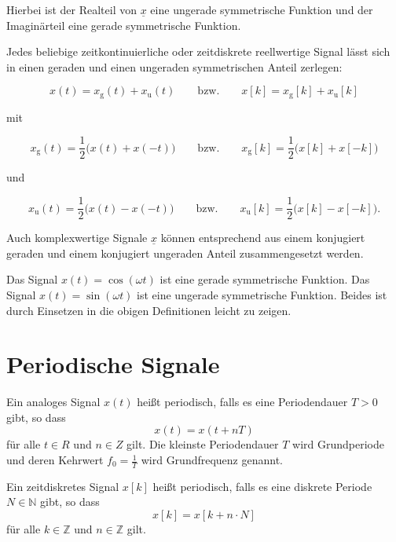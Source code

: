 Hierbei ist der Realteil von $\underline{x}$ eine ungerade symmetrische Funktion und der Imaginärteil eine gerade symmetrische Funktion.

Jedes beliebige zeitkontinuierliche oder zeitdiskrete reellwertige Signal lässt sich in einen geraden und einen ungeraden symmetrischen Anteil zerlegen:

$$
x(t) = x_{\mathrm{g}}(t) + x_{\mathrm{u}}(t) \qquad \text{bzw.} \qquad x[k] = x_{\mathrm{g}}[k] + x_{\mathrm{u}}[k]
$$

mit

$$
x_{\mathrm{g}}(t) = \frac{1}{2}\bigl(x(t) + x(-t)\bigr) \qquad \text{bzw.} \qquad x_{\mathrm{g}}[k] = \frac{1}{2}\bigl(x[k] + x[-k]\bigr)
$$

und

$$
x_{\mathrm{u}}(t) = \frac{1}{2}\bigl(x(t) - x(-t)\bigr) \qquad \text{bzw.} \qquad x_{\mathrm{u}}[k] = \frac{1}{2}\bigl(x[k] - x[-k]\bigr).
$$

Auch komplexwertige Signale $\underline{x}$ können entsprechend aus einem konjugiert geraden und einem konjugiert ungeraden Anteil zusammengesetzt werden.

\begin{beispiel}[Symmetrie]
Das Signal $x(t) = \cos(\omega t)$ ist eine gerade symmetrische Funktion. Das Signal $x(t) = \sin(\omega t)$ ist eine ungerade symmetrische Funktion. Beides ist durch Einsetzen in die obigen Definitionen leicht zu zeigen.
\end{beispiel}


\section{Periodische Signale}
\label{sec:periodische-signale}

\begin{definition}
Ein analoges Signal $x(t)$ heißt periodisch, falls es eine Periodendauer
$T > 0$ gibt, so dass
$$
x(t) = x(t + nT)
$$
für alle $t \in R$ und $n \in Z$ gilt.
Die kleinste Periodendauer $T$ wird Grundperiode und deren Kehrwert $f_0 = \frac{1}{T}$ wird
Grundfrequenz genannt.
\end{definition}

\begin{definition}
Ein zeitdiskretes Signal $x[k]$ heißt periodisch, falls es eine diskrete
Periode $N \in \mathbb{N}$ gibt, so dass
$$
x[k] = x[k + n \cdot N]
$$
für alle $k \in \mathbb{Z}$ und $n \in \mathbb{Z}$ gilt.
\end{definition}



